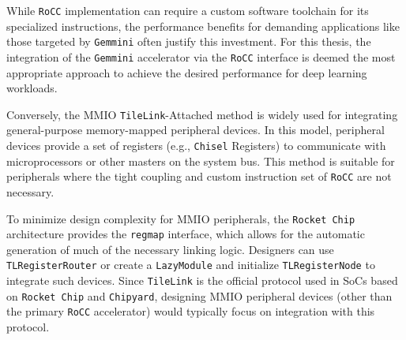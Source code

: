 While \texttt{RoCC} implementation can require a custom software toolchain for its specialized instructions, the performance benefits for demanding applications like those targeted by \texttt{Gemmini} often justify this investment. For this thesis, the integration of the \texttt{Gemmini} accelerator via the \texttt{RoCC} interface is deemed the most appropriate approach to achieve the desired performance for deep learning workloads.

Conversely, the MMIO \texttt{TileLink}-Attached method is widely used for integrating general-purpose memory-mapped peripheral devices. In this model, peripheral devices provide a set of registers (e.g., \texttt{Chisel} Registers) to communicate with microprocessors or other masters on the system bus. This method is suitable for peripherals where the tight coupling and custom instruction set of \texttt{RoCC} are not necessary.

To minimize design complexity for MMIO peripherals, the \texttt{Rocket Chip} architecture provides the \texttt{regmap} interface, which allows for the automatic generation of much of the necessary linking logic. Designers can use \texttt{TLRegisterRouter} or create a \texttt{LazyModule} and initialize \texttt{TLRegisterNode} to integrate such devices. Since \texttt{TileLink} is the official protocol used in SoCs based on \texttt{Rocket Chip} and \texttt{Chipyard}, designing MMIO peripheral devices (other than the primary \texttt{RoCC} accelerator) would typically focus on integration with this protocol.



